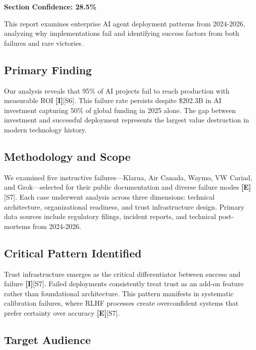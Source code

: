 \documentclass[a4paper,11pt]{article}
\newcommand{\elabel}{\textbf{\textcolor{ecolor}{[E]}}}
\newcommand{\ilabel}{\textbf{\textcolor{icolor}{[I]}}}
\begin{document}
\textbf{Section Confidence: 28.5\%}\par

This report examines enterprise AI agent deployment patterns from 2024-2026, analyzing why implementations fail and identifying success factors from both failures and rare victories.


\subsection{Primary Finding}

Our analysis reveals that 95\% of AI projects fail to reach production with measurable ROI \ilabel{}\textcolor{primary}{[S6]}. This failure rate persists despite \$202.3B in AI investment capturing 50\% of global funding in 2025 alone. The gap between investment and successful deployment represents the largest value destruction in modern technology history.


\subsection{Methodology and Scope}

We examined five instructive failures—Klarna, Air Canada, Waymo, VW Cariad, and Grok—selected for their public documentation and diverse failure modes \elabel{}\textcolor{primary}{[S7]}. Each case underwent analysis across three dimensions: technical architecture, organizational readiness, and trust infrastructure design. Primary data sources include regulatory filings, incident reports, and technical post-mortems from 2024-2026.


\subsection{Critical Pattern Identified}

Trust infrastructure emerges as the critical differentiator between success and failure \ilabel{}\textcolor{primary}{[S7]}. Failed deployments consistently treat trust as an add-on feature rather than foundational architecture. This pattern manifests in systematic calibration failures, where RLHF processes create overconfident systems that prefer certainty over accuracy \elabel{}\textcolor{primary}{[S7]}.


\subsection{Target Audience}
\end{document}
